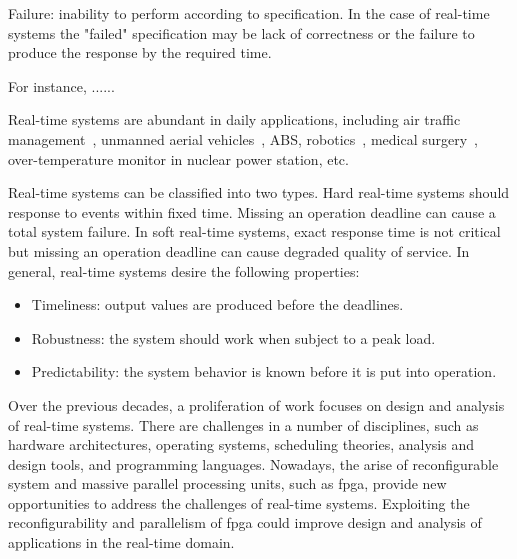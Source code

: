 \begin{myDef}
Failure: inability to perform according to specification.
In the case of real-time systems the "failed" specification may be lack of correctness or the failure to produce the response by the required time.
\end{myDef}

For instance, ......



Real-time systems are abundant in daily applications, including air traffic management~\cite{crisostomi07,eele11}, unmanned aerial vehicles~\cite{ortiz06}, ABS, robotics~\cite{dellaert99}, medical surgery~\cite{kwok10}, over-temperature monitor in nuclear power station, etc.

Real-time systems can be classified into two types. Hard real-time systems should response to events within fixed time. Missing an operation deadline can cause a total system failure. In soft real-time systems, exact response time is not critical but missing an operation deadline can cause degraded quality of service. In general, real-time systems desire the following properties:

\begin{itemize}
\item Timeliness: output values are produced before the deadlines.
\item Robustness: the system should work when subject to a peak load.
\item Predictability: the system behavior is known before it is put into operation.
\end{itemize}


Over the previous decades, a proliferation of work focuses on design and analysis of real-time systems. There are challenges in a number of disciplines, such as hardware architectures, operating systems, scheduling theories, analysis and design tools, and programming languages. Nowadays, the arise of reconfigurable system and massive parallel processing units, such as \gls{fpga}, provide new opportunities to address the challenges of real-time systems. Exploiting the reconfigurability and parallelism of \gls{fpga} could improve design and analysis of applications in the real-time domain.

